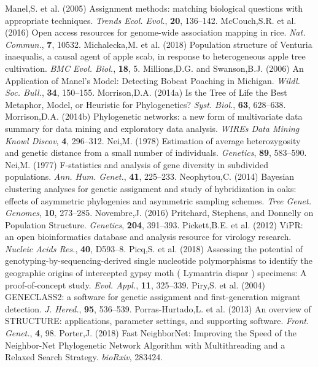 \documentclass{bioinfo}
\begin{document}
\begin{thebibliography}{}
\bibitem[a ()]{}Manel,S. et al. (2005) Assignment methods: matching biological questions with appropriate techniques. \textit{Trends Ecol. Evol.}, \textbf{20}, 136–142.
\bibitem[a ()]{}McCouch,S.R. et al. (2016) Open access resources for genome-wide association mapping in rice. \textit{Nat. Commun.},\textbf{ 7}, 10532.
\bibitem[a ()]{}Michalecka,M. et al. (2018) Population structure of Venturia inaequalis, a causal agent of apple scab, in response to heterogeneous apple tree cultivation. \textit{BMC Evol. Biol.}, \textbf{18}, 5.
\bibitem[a ()]{}Millions,D.G. and Swanson,B.J. (2006) An Application of Manel’s Model: Detecting Bobcat Poaching in Michigan. \textit{Wildl. Soc. Bull.}, \textbf{34}, 150–155.
\bibitem[a ()]{}Morrison,D.A. (2014a) Is the Tree of Life the Best Metaphor, Model, or Heuristic for Phylogenetics? \textit{Syst. Biol.}, \textbf{63}, 628–638.
\bibitem[a ()]{}Morrison,D.A. (2014b) Phylogenetic networks: a new form of multivariate data summary for data mining and exploratory data analysis. \textit{WIREs Data Mining Knowl Discov}, \textbf{4}, 296–312.
\bibitem[a ()]{}Nei,M. (1978) Estimation of average heterozygosity and genetic distance from a small number of individuals. \textit{Genetics}, \textbf{89}, 583–590.
\bibitem[a ()]{}Nei,M. (1977) F-statistics and analysis of gene diversity in subdivided populations. \textit{Ann. Hum. Genet.}, \textbf{41}, 225–233.
\bibitem[a ()]{}Neophytou,C. (2014) Bayesian clustering analyses for genetic assignment and study of hybridization in oaks: effects of asymmetric phylogenies and asymmetric sampling schemes. \textit{Tree Genet. Genomes}, \textbf{10}, 273–285.
\bibitem[a ()]{}Novembre,J. (2016) Pritchard, Stephens, and Donnelly on Population Structure. \textit{Genetics}, \textbf{204}, 391–393.
\bibitem[a ()]{}Pickett,B.E. et al. (2012) ViPR: an open bioinformatics database and analysis resource for virology research. \textit{Nucleic Acids Res.}, \textbf{40}, D593–8.
\bibitem[a ()]{}Picq,S. et al. (2018) Assessing the potential of genotyping-by-sequencing-derived single nucleotide polymorphisms to identify the geographic origins of intercepted gypsy moth ( Lymantria dispar ) specimens: A proof-of-concept study. \textit{Evol. Appl.},\textbf{ 11}, 325–339.
\bibitem[a ()]{}Piry,S. et al. (2004) GENECLASS2: a software for genetic assignment and first-generation migrant detection. \textit{J. Hered.}, \textbf{95}, 536–539.
\bibitem[a ()]{}Porras-Hurtado,L. et al. (2013) An overview of STRUCTURE: applications, parameter settings, and supporting software. \textit{Front. Genet.}, \textbf{4}, 98.
\bibitem[a ()]{}Porter,J. (2018) Fast NeighborNet: Improving the Speed of the Neighbor-Net Phylogenetic Network Algorithm with Multithreading and a Relaxed Search Strategy. \textit{bioRxiv}, 283424.

\end{thebibliography}
\end{document}
